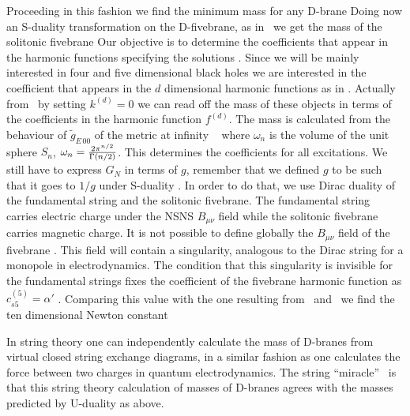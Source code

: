 Proceeding in this fashion we 
find the minimum mass for any D-brane
\eqn{}
Doing now an S-duality transformation 
on the D-fivebrane, as in \massdf\  we get the mass
of the solitonic fivebrane
\eqn{}
Our objective is to determine the coefficients that
appear in the harmonic functions specifying the solutions
\fundstr \fivebrane \pbrane . 
Since we will be mainly interested in four and five
dimensional black holes we are interested in the
coefficient that appears in the $d$ dimensional 
harmonic functions as in \lambdaddim \ddimdil . Actually
from \ddimdil\ by  setting  $k^{(d)} = 0$ we can read 
off the mass of these objects in terms of the coefficients
in the harmonic function $f^{(d)}$. The mass is 
calculated  from the behaviour of $\tilde g_{E \, 00}$ of the
metric at infinity \myresperry\
\eqn{}
where $\omega_n$ is the volume of the unit sphere $S_n$, $
\omega_n = { 2 \pi^{n/2} \over \Gamma(n/2) } $.
This determines the coefficients for all excitations.
We still have to express $G_N $ in terms of $g$, remember that
we defined $g$ to be such that it goes to $1/g$ under S-duality
 \sduality .  
In order to do that, we use Dirac duality of the 
fundamental string and the solitonic fivebrane. 
The fundamental string carries electric charge under the NSNS
$B_{\mu\nu}$ field while the solitonic fivebrane carries magnetic
charge. It is not possible to define globally the $B_{\mu \nu}$
field of the fivebrane \fivebrane . This field will contain 
a singularity, analogous to the Dirac string for a monopole
in electrodynamics. The condition that this 
 singularity is  invisible for the
fundamental strings
fixes the coefficient of the fivebrane
harmonic function as $ c_{s5}^{(5)} = \alpha' $ \callanfive {}.
Comparing this value with the one resulting from \adm\ and
\massfive\ we find the ten dimensional Newton constant
\eqn{}

In string theory one can independently calculate the 
mass of D-branes from virtual closed string exchange diagrams,
in a similar fashion as one calculates the force between 
two charges in quantum electrodynamics.
The string ``miracle''  \polchinski\ 
is that this  string theory calculation  of
 masses of D-branes
agrees  with the masses predicted  by 
 U-duality as above.

